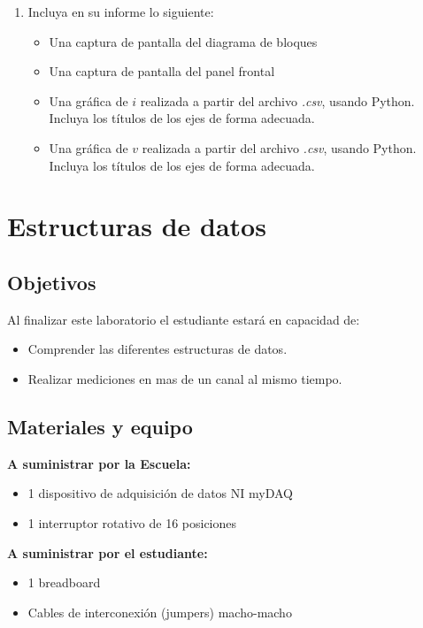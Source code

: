 \documentclass[12pt,letterpaper]{report}
\newcommand{\obj}{Objetivos}
\newcommand{\mat}{Materiales y equipo}
\newcommand{\capacidad}{Al finalizar este laboratorio el estudiante estará en capacidad de:}
\begin{document}
\begin{enumerate}
\item Incluya en su informe lo siguiente:
    \begin{itemize}
        \item Una captura de pantalla del diagrama de bloques
        \item Una captura de pantalla del panel frontal
        \item Una gráfica de $i$ realizada a partir del archivo \emph{.csv}, usando Python. Incluya los títulos de los ejes de forma adecuada. 
        \item Una gráfica de $v$ realizada a partir del archivo \emph{.csv}, usando Python. Incluya los títulos de los ejes de forma adecuada. 
    \end{itemize}
\end{enumerate}

\chapter{Estructuras de datos}
\section{\obj}
\capacidad
\begin{itemize}
\item Comprender las diferentes estructuras de datos.
\item Realizar mediciones en mas de un canal al mismo tiempo.
\end{itemize}

\section{\mat}
\textbf{A suministrar por la Escuela:}
\begin{itemize}
\item 1 dispositivo de adquisición de datos NI myDAQ
\item 1 interruptor rotativo de 16 posiciones 

\end{itemize}
\textbf{A suministrar por el estudiante:}
\begin{itemize}
\item 1 breadboard
\item Cables de interconexión (jumpers) macho-macho
\end{itemize}
\end{document}
